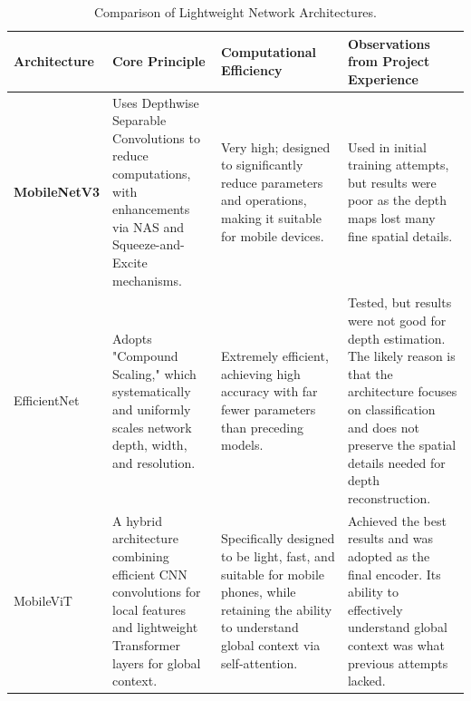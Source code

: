 \begin{table}[htbp!]
    \centering
    \caption{Comparison of Lightweight Network Architectures.}
    \label{tab:arch_comparison}

    \begin{tabularx}{\textwidth}{
        >{\bfseries}l 
        >{\RaggedRight}X 
        >{\RaggedRight}X 
        >{\RaggedRight\arraybackslash}X 
    }
        \toprule
        Architecture & Core Principle & Computational Efficiency & Observations from Project Experience \\
        \midrule
        MobileNetV3 & 
        Uses Depthwise Separable Convolutions to reduce computations, with enhancements via NAS and Squeeze-and-Excite mechanisms. &
        Very high; designed to significantly reduce parameters and operations, making it suitable for mobile devices. & 
        Used in initial training attempts, but results were poor as the depth maps lost many fine spatial details. \\
        \addlinespace

        EfficientNet & 
        Adopts "Compound Scaling," which systematically and uniformly scales network depth, width, and resolution. & 
        Extremely efficient, achieving high accuracy with far fewer parameters than preceding models. & 
        Tested, but results were not good for depth estimation. The likely reason is that the architecture focuses on classification and does not preserve the spatial details needed for depth reconstruction. \\
        \addlinespace

        MobileViT & 
        A hybrid architecture combining efficient CNN convolutions for local features and lightweight Transformer layers for global context. &
        Specifically designed to be light, fast, and suitable for mobile phones, while retaining the ability to understand global context via self-attention. & 
        Achieved the best results and was adopted as the final encoder. Its ability to effectively understand global context was what previous attempts lacked. \\
        \bottomrule
    \end{tabularx}
\end{table}